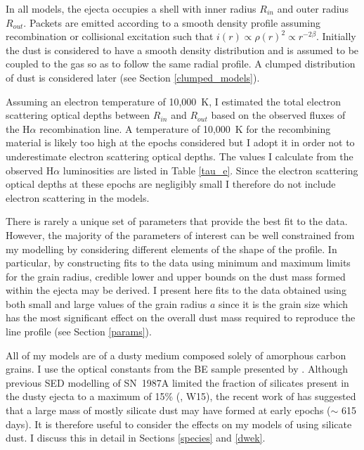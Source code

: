 In all models, the ejecta occupies a shell with inner radius $R_{in}$ and 
outer radius $R_{out}$.  Packets are emitted according to a smooth density 
profile assuming recombination or collisional excitation such that $i(r) 
\propto \rho(r)^2 \propto r^{-2\beta}$.  Initially the dust is considered 
to have a smooth density distribution and is assumed to be coupled to the 
gas so as to follow the same radial profile.  A clumped distribution of 
dust is considered later (see Section \ref{clumped_models}).

Assuming an electron temperature of 10,000~K, I estimated the total electron scattering optical depths between $R_{in}$ and $R_{out}$ based on the 
observed fluxes of the H$\alpha$ recombination line. A temperature of 10,000~K for the recombining material is 
likely too high at the epochs considered but I adopt it in order
not to underestimate electron scattering optical depths.  The values 
I calculate from the observed H$\alpha$ luminosities are listed in Table 
\ref{tau_e}.  Since the electron scattering optical depths at these epochs 
are negligibly small I therefore do not include electron scattering in 
the models.




There is rarely a unique set of parameters that provide the best fit to 
the data.  However, the majority of the parameters of interest can be well 
constrained from my modelling by considering different elements of the 
shape of the profile.  In particular, by constructing fits to the data 
using minimum and maximum limits for the grain radius, credible lower and 
upper bounds on the dust mass formed within the ejecta may be derived.  
I present here fits to the data obtained using both small and large 
values of the grain radius $a$ since it is the grain size which has the 
most significant effect on the overall dust mass required to reproduce the 
line profile (see Section \ref{params}).


All of my models are of a dusty medium composed solely of amorphous 
carbon grains. I use the optical constants from the BE sample presented 
by \citet{Zubko1996}.  Although previous SED modelling of SN~1987A  
limited the fraction of silicates present in the dusty ejecta to a maximum 
of 15\% (\citet{Ercolano2007}, W15), the recent work of \citet{Dwek2015} has suggested that a large mass of mostly silicate dust may have formed at early epochs ($\sim$ 615 days).  It is therefore useful to consider the effects 
on my models of using silicate dust.  I discuss this in detail in 
Sections \ref{species} and \ref{dwek}.

